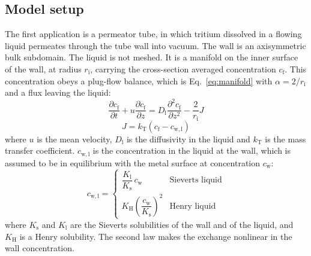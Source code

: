 \documentclass[5p]{elsarticle}
\begin{document}
\subsection{Model setup}
\label{sec:app:pfr:setup}

The first application is a permeator tube, in which tritium dissolved in a flowing liquid permeates through the tube wall into vacuum.
The wall is an axisymmetric bulk subdomain.
The liquid is not meshed.
It is a manifold on the inner surface of the wall, at radius $r_\mathrm{i}$, carrying the cross-section averaged concentration $c_\mathrm{f}$.
This concentration obeys a plug-flow balance, which is Eq.~\ref{eq:manifold} with $\alpha = 2/r_\mathrm{i}$ and a flux leaving the liquid:
\begin{equation}
    \frac{\partial c_\mathrm{f}}{\partial t} + u \frac{\partial c_\mathrm{f}}{\partial z} = D_\mathrm{l} \frac{\partial^2 c_\mathrm{f}}{\partial z^2} - \frac{2}{r_\mathrm{i}} J
    \label{eq:pfr}
\end{equation}
\begin{equation}
    J = k_\mathrm{T} \left( c_\mathrm{f} - c_\mathrm{w,l} \right)
    \label{eq:pfr:J}
\end{equation}
where $u$ is the mean velocity, $D_\mathrm{l}$ is the diffusivity in the liquid and $k_\mathrm{T}$ is the mass transfer coefficient.
$c_\mathrm{w,l}$ is the concentration in the liquid at the wall, which is assumed to be in equilibrium with the metal surface at concentration $c_\mathrm{w}$:
\begin{equation}
    c_\mathrm{w,l} =
    \begin{cases}
        \dfrac{K_\mathrm{l}}{K_\mathrm{s}}\, c_\mathrm{w} & \text{Sieverts liquid} \\[2ex]
        K_\mathrm{H} \left( \dfrac{c_\mathrm{w}}{K_\mathrm{s}} \right)^2 & \text{Henry liquid}
    \end{cases}
    \label{eq:pfr:eq}
\end{equation}
where $K_\mathrm{s}$ and $K_\mathrm{l}$ are the Sieverts solubilities of the wall and of the liquid, and $K_\mathrm{H}$ is a Henry solubility.
The second law makes the exchange nonlinear in the wall concentration.
\end{document}
